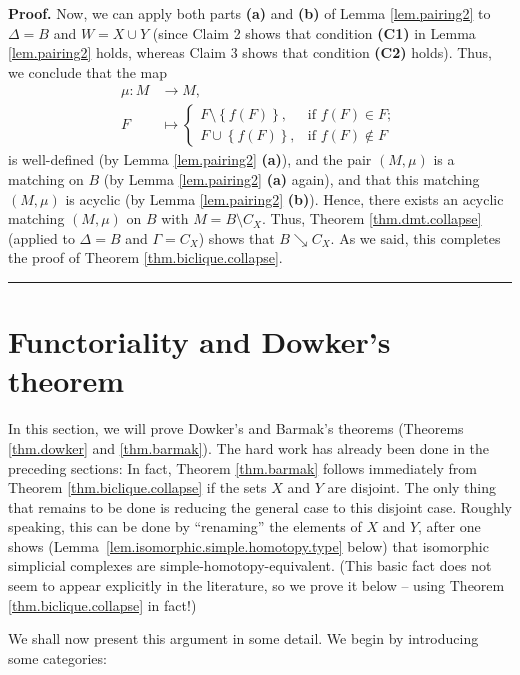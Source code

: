 \documentclass[numbers=enddot,12pt,final,onecolumn,notitlepage]{scrartcl}%
\theoremstyle{definition}
\newenvironment{proof}[1][Proof]{\noindent\textbf{#1.} }{\ \rule{0.5em}{0.5em}}
\begin{document}
\begin{proof}
Now, we can apply both parts \textbf{(a)} and \textbf{(b)} of Lemma
\ref{lem.pairing2} to $\Delta=B$ and $W=X\cup Y$ (since Claim 2 shows that
condition \textbf{(C1)} in Lemma \ref{lem.pairing2} holds, whereas Claim 3
shows that condition \textbf{(C2)} holds). Thus, we conclude that the map%
\begin{align*}
\mu:M  &  \rightarrow M,\\
F  &  \mapsto%
\begin{cases}
F\setminus\left\{  f\left(  F\right)  \right\}  , & \text{if }f\left(
F\right)  \in F;\\
F\cup\left\{  f\left(  F\right)  \right\}  , & \text{if }f\left(  F\right)
\notin F
\end{cases}
\end{align*}
is well-defined (by Lemma \ref{lem.pairing2} \textbf{(a)}), and the pair
$\left(  M,\mu\right)  $ is a matching on $B$ (by Lemma \ref{lem.pairing2}
\textbf{(a)} again), and that this matching $\left(  M,\mu\right)  $ is
acyclic (by Lemma \ref{lem.pairing2} \textbf{(b)}). Hence, there exists an
acyclic matching $\left(  M,\mu\right)  $ on $B$ with $M=B\setminus C_{X}$.
Thus, Theorem \ref{thm.dmt.collapse} (applied to $\Delta=B$ and $\Gamma=C_{X}%
$) shows that $B\searrow C_{X}$. As we said, this completes the proof of
Theorem \ref{thm.biclique.collapse}.
\end{proof}

\section{Functoriality and Dowker's theorem}

In this section, we will prove Dowker's and Barmak's theorems
(Theorems \ref{thm.dowker} and \ref{thm.barmak}).
The hard work has already been done in the preceding sections:
In fact, Theorem \ref{thm.barmak} follows immediately from
Theorem \ref{thm.biclique.collapse} if the sets $X$ and $Y$ are disjoint.
The only thing that remains to be done is reducing the general case
to this disjoint case.
Roughly speaking, this can be done by ``renaming'' the elements of
$X$ and $Y$, after one shows (Lemma~\ref{lem.isomorphic.simple.homotopy.type}
below) that isomorphic simplicial complexes are simple-homotopy-equivalent.
(This basic fact does not seem to appear explicitly in the literature,
so we prove it below -- using Theorem \ref{thm.biclique.collapse}
in fact!)

We shall now present this argument in some detail.
We begin by introducing some categories:
\end{document}
